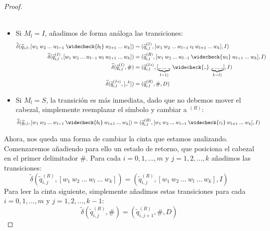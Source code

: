 \begin{proof}
\begin{itemize}
\begin{align}
    \end{align}
    \item Si $M_l=I$, añadimos de forma análoga las transiciones:
    \begin{align}
        \widetilde{\delta}(\widetilde{q}_{i,l}, [w_1\:w_2\:...\:w_{l-1}\:\widecheck{b_l}\:w_{l+1}\:...\:w_k]) &= (\widetilde{q}_{i,l}^{(I)}, [w_1\:w_2\:...\:w_{l-1}\:c_l\:w_{l+1}\:...\:w_k], I)\\
        \widetilde{\delta}(\widetilde{q}_{i,l}^{(I)}, [w_1\:w_2\:...\:w_{l-1}\:w_l\:w_{l+1}\:...\:w_k]) &= (\widetilde{q}_{i,l}^{(R)}, [w_1\:w_2\:...\:w_{l-1}\:\widecheck{w_l}\:w_{l+1}\:...\:w_k], I)\\
        \widetilde{\delta}(\widetilde{q}_{i,l}^{(I)}, \#) &= (\widetilde{q}_{i,l}^{(Is)}, [\underbrace{{\Vtextvisiblespace} \:... \:{\Vtextvisiblespace}}_{l-1)}\:\widecheck{\Vtextvisiblespace}\:\underbrace{{\Vtextvisiblespace} \:... \:{\Vtextvisiblespace}}_{k-l)}], I)\\
        \widetilde{\delta}(\widetilde{q}_{i,l}^{(Is)}, [\Vtextvisiblespace^k]) &= (\widetilde{q}_{i,l}^{(R)}, \#, D)\\
    \end{align}
    \item Si $M_l=S$, la transición es más inmediata, dado que no debemos mover el cabezal, simplemente reemplazar el símbolo y cambiar a $^{(R)}$:
    \begin{align}
        \widetilde{\delta}(\widetilde{q}_{i,l}, [w_1\:w_2\:...\:w_{l-1}\:\widecheck{b_l}\:w_{l+1}\:...\:w_k]) &= (\widetilde{q}_{i,l}^{(R)}, [w_1\:w_2\:...\:w_{l-1}\:\widecheck{c_l}\:w_{l+1}\:...\:w_k], I)
    \end{align}
\end{itemize}
Ahora, nos queda una forma de cambiar la cinta que estamos analizando. Comenzaremos añadiendo para ello un estado de retorno, que posiciona el cabezal en el primer delimitador $\#$. Para cada $i=0,1,...,m$ y $j=1,2,...,k$ añadimos las transiciones:
\begin{equation}
    \widetilde{\delta}(\widetilde{q}_{i,j}^{(R)}, [w_1\:w_2\:...\:w_l\:...\:w_k]) = (\widetilde{q}_{i,j}^{(R)}, [w_1\:w_2\:...\:w_l\:...\:w_k], I)
\end{equation}
Para leer la cinta siguiente, simplemente añadimos estas transiciones para cada $i=0,1,...,m$ y $j=1,2,...,k-1$:
\begin{equation}
    \widetilde{\delta}(\widetilde{q}_{i,j}^{(R)}, \#) = (\widetilde{q}_{i,j+1}^{(R)}, \#, D)
\end{equation}

\end{proof}
